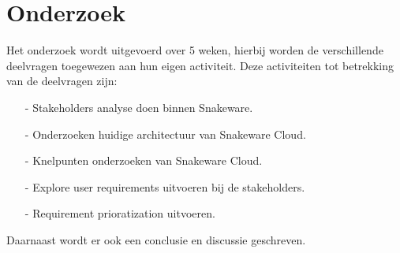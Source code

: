 \section{Onderzoek}
Het onderzoek wordt uitgevoerd over 5 weken, hierbij worden de verschillende deelvragen toegewezen aan hun eigen activiteit.
Deze activiteiten tot betrekking van de deelvragen zijn: 

\whitespace
\begin{itemize}
	\item[-] Stakeholders analyse doen binnen Snakeware.
	\item[-] Onderzoeken huidige architectuur van Snakeware Cloud.
	\item[-] Knelpunten onderzoeken van Snakeware Cloud.
	\item[-] Explore user requirements uitvoeren bij de stakeholders.
	\item[-] Requirement prioratization uitvoeren.
\end{itemize}

\whitespace
Daarnaast wordt er ook een conclusie en discussie geschreven.

